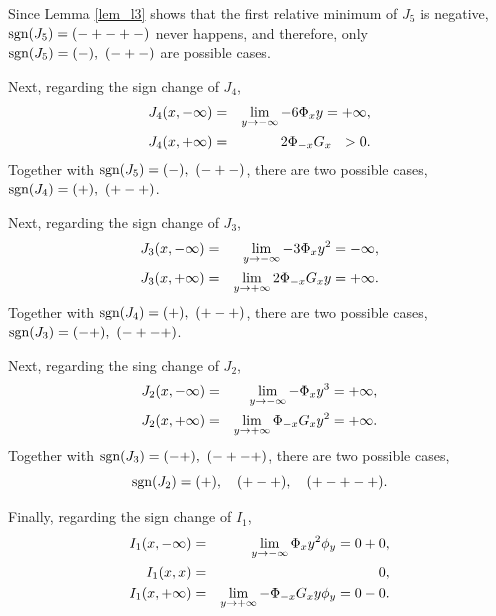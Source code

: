 Since Lemma \ref{lem_l3} shows that the first relative minimum of $J_5$ is negative, $\mbox{sgn}(J_5)=(-+-+-)$ never happens, and therefore, only $\sgn(J_5)=(-),\ (-+-)$ are possible cases.

Next, regarding the sign change of $J_4$,
\begin{eqnarray*}
 J_4(x,-\infty) & = & \lim_{y \rightarrow -\infty} - 6 \Phi_x y = + \infty, \label{eq_l67} \\
 J_4(x,+\infty) & = & 2 \Phi_{-x} G_x \ \ > 0. \label{eq_l68}
\end{eqnarray*}
Together with $\sgn(J_5)=(-),\ (-+-)$, there are two possible cases, $\sgn(J_4)=(+),\ (+-+)$.

Next, regarding the sign change of $J_3$,
\begin{eqnarray*}
 J_3(x,-\infty) & = & \lim_{y \rightarrow -\infty} - 3 \Phi_x y^2 = - \infty, \label{eq_l69} \\
 J_3(x,+\infty) & = & \lim_{y \rightarrow +\infty} 2 \Phi_{-x} G_x y = + \infty. \label{eq_l70}
\end{eqnarray*}
Together with $\sgn(J_4)=(+),\ (+-+)$, there are two possible cases, $\sgn(J_3)=(-+),\ (-+-+)$.

Next, regarding the sing change of $J_2$,
\begin{eqnarray*}
 J_2(x,-\infty) & = & \lim_{y \rightarrow -\infty} - \Phi_x y^3 = + \infty, \label{eq_l71} \\
 J_2(x,+\infty) & = & \lim_{y \rightarrow +\infty} \Phi_{-x} G_x y^2 = + \infty. \label{eq_l72}
\end{eqnarray*}
Together with $\sgn(J_3)=(-+),\ (-+-+)$, there are two possible cases,
\begin{equation}\label{eq_l73}
 \mbox{sgn}(J_2)=(+), \quad (+-+), \quad (+-+-+).
\end{equation}

Finally, regarding the sign change of $I_1$,
\begin{eqnarray}
 I_1(x,-\infty) & = & \lim_{y \rightarrow -\infty} \Phi_x y^2 \phi_y = 0 + 0, \label{eq_l74} \\
 I_1(x,x) & = & 0, \label{eq_l75} \\
 I_1(x,+\infty) & = & \lim_{y \rightarrow +\infty} - \Phi_{-x} G_x y \phi_y = 0 - 0. \label{eq_l76}
\end{eqnarray}

\bigskip

